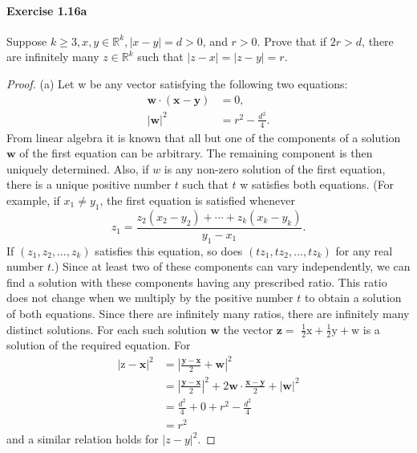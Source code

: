 \documentclass{article}
\theoremstyle{definition}
\begin{document}
\paragraph{Exercise 1.16a} Suppose $k \geq 3, x, y \in \mathbb{R}^k, |x - y| = d > 0$, and $r > 0$. Prove that if $2r > d$, there are infinitely many $z \in \mathbb{R}^k$ such that $|z-x|=|z-y|=r$.
\begin{proof}
    (a) Let w be any vector satisfying the following two equations:
$$
\begin{aligned}
\mathbf{w} \cdot(\mathbf{x}-\mathbf{y}) &=0, \\
|\mathbf{w}|^2 &=r^2-\frac{d^2}{4} .
\end{aligned}
$$
From linear algebra it is known that all but one of the components of a solution $\mathbf{w}$ of the first equation can be arbitrary. The remaining component is then uniquely determined. Also, if $w$ is any non-zero solution of the first equation, there is a unique positive number $t$ such that $t$ w satisfies both equations. (For example, if $x_1 \neq y_1$, the first equation is satisfied whenever
$$
z_1=\frac{z_2\left(x_2-y_2\right)+\cdots+z_k\left(x_k-y_k\right)}{y_1-x_1} .
$$
If $\left(z_1, z_2, \ldots, z_k\right)$ satisfies this equation, so does $\left(t z_1, t z_2, \ldots, t z_k\right)$ for any real number $t$.) Since at least two of these components can vary independently, we can find a solution with these components having any prescribed ratio. This ratio does not change when we multiply by the positive number $t$ to obtain a solution of both equations. Since there are infinitely many ratios, there are infinitely many distinct solutions. For each such solution $\mathbf{w}$ the vector $\mathbf{z}=$ $\frac{1}{2} \mathrm{x}+\frac{1}{2} \mathrm{y}+\mathrm{w}$ is a solution of the required equation. For
$$
\begin{aligned}
|\mathrm{z}-\mathbf{x}|^2 &=\left|\frac{\mathbf{y}-\mathbf{x}}{2}+\mathbf{w}\right|^2 \\
&=\left|\frac{\mathbf{y}-\mathbf{x}}{2}\right|^2+2 \mathbf{w} \cdot \frac{\mathbf{x}-\mathbf{y}}{2}+|\mathbf{w}|^2 \\
&=\frac{d^2}{4}+0+r^2-\frac{d^2}{4} \\
&=r^2
\end{aligned}
$$
and a similar relation holds for $|z-y|^2$.
\end{proof}
\end{document}
